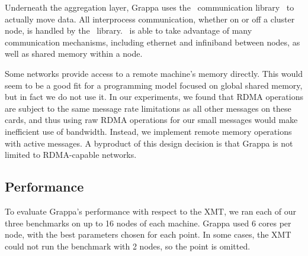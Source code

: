 Underneath the aggregation layer, Grappa uses the \gasnet~communication library~\cite{gasnet} to actually move data. All interprocess communication, whether on or off a cluster node, is handled by the \gasnet~library. \gasnet~is able to take advantage of many communication mechanisms, including ethernet and infiniband between nodes, as well as shared memory within a node.

Some networks provide access to a remote machine's memory directly. This would seem to be a good fit for a programming model focused on global shared memory, but in fact we do not use it. In our experiments, we found that RDMA operations are subject to the same message rate limitations as all other messages on these cards, and thus using raw RDMA operations for our small messages would make inefficient use of bandwidth. Instead, we implement remote memory operations with active messages. A byproduct of this design decision is that Grappa is not limited to RDMA-capable networks.

\subsection{Performance}

To evaluate Grappa's performance with respect to the XMT, we ran each of our three benchmarks on up to 16 nodes of each machine. Grappa used 6 cores per node, with the best parameters chosen for each point. In some cases, the XMT could not run the benchmark with 2 nodes, so the point is omitted.

